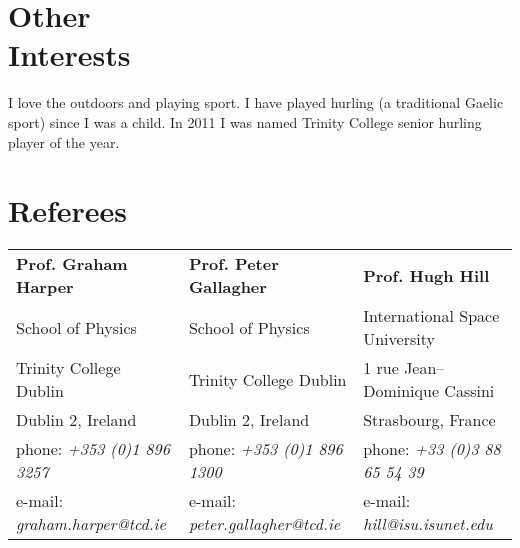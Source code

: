 \documentclass[margin,line]{resume}
\begin{document}
\begin{resume}
    \vspace{4mm}
    \section{\mysidestyle Other\\Interests} 
    
	I love the outdoors and playing sport. I have played hurling (a traditional Gaelic sport) since I was a child. In 2011 I was named Trinity College senior hurling player of the year.

    
     


\vspace{4mm}
\section{\mysidestyle Referees} 

\begin{tabular}{@{}p{4.6cm}p{4.6cm}p{4.8cm}}
\textbf{Prof. Graham Harper}       &  \textbf{Prof. Peter Gallagher}   &  \textbf{Prof. Hugh Hill} \\
School of Physics                      &  School of Physics                   &  International Space University \\
Trinity College Dublin                 &  Trinity College Dublin                   &  1 rue Jean--Dominique Cassini \\
Dublin 2, Ireland				       &  Dublin 2, Ireland		         &  Strasbourg, France \\
phone: \textsl{+353 (0)1 896 3257}    &  phone: \textsl{+353 (0)1 896 1300} &  phone: \textsl{+33 (0)3 88 65 54 39} \\
e-mail: \textsl{graham.harper@tcd.ie}   &  e-mail: \textsl{peter.gallagher@tcd.ie}&  e-mail: \textsl{hill@isu.isunet.edu} \\
\end{tabular}




\end{resume}
\end{document}
